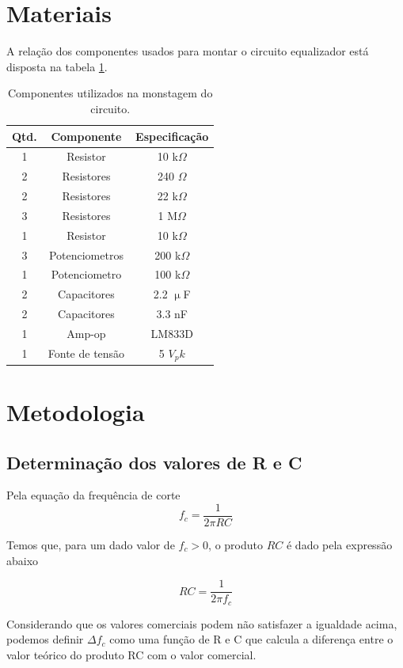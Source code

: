 \documentclass{article}
\begin{document}
\section{Materiais}
A relação dos componentes usados para montar o circuito equalizador está disposta na tabela \ref{tab:materiais}.

\begin{table}[h!]
  \centering
  \begin{tabular}{ccc}
    \toprule
    Qtd. & Componente      & Especificação \\
    \midrule
    1    & Resistor        & 10 k$\Omega$  \\
    2    & Resistores      & 240 $\Omega$  \\
    2    & Resistores      & 22 k$\Omega$  \\
    3    & Resistores      & 1 M$\Omega$   \\
    1    & Resistor        & 10 k$\Omega$  \\
    3    & Potenciometros  & 200 k$\Omega$ \\
    1    & Potenciometro   & 100 k$\Omega$ \\
    2    & Capacitores     & 2.2 $\upmu$F  \\
    2    & Capacitores     & 3.3 nF        \\
    1    & Amp-op          & LM833D        \\
    1    & Fonte de tensão & 5 $V_pk$      \\
    \bottomrule
  \end{tabular}
  \caption{Componentes utilizados na monstagem do circuito.}
  \label{tab:materiais}
\end{table}

\section{Metodologia}
\subsection{Determinação dos valores de R e C}

Pela equação da frequência de corte
$$
  f_c = \frac{1}{2\pi RC}
$$

Temos que, para um dado valor de $f_c > 0$, o produto $RC$ é dado pela expressão abaixo

$$
  RC = \frac{1}{2\pi f_c}
$$

Considerando que os valores comerciais podem não satisfazer a igualdade acima, podemos definir $\Delta f_c$ como uma função de R e C que calcula a diferença entre o valor teórico do produto RC com o valor comercial.
\end{document}
